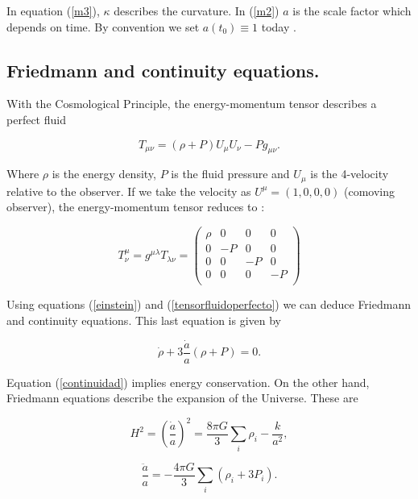 \documentclass[onecolumn,           %
               showpacs,            %
               preprintnumbers,     %
               aps,                 %
               letterpaper,             %
               superscriptaddress,      %
               nofootinbib,         %
               tightenlines,        %
               floats,floatfix      %
               ,usenatbib,
               ]{revtex4-1}
\begin{document}
In equation (\ref{m3}), $\kappa$ describes the curvature. In (\ref{m2}) $a$ is the scale factor which depends on time. By convention we set $a(t_0) \equiv 1$ today \cite{cambridge}.

\subsection{Friedmann and continuity equations.}
With the Cosmological Principle, the energy-momentum tensor describes a perfect fluid \cite{cambridge}

\begin{equation}
\label{tensorfluidoperfecto}
T_{\mu \nu} = (\rho + P)U_{\mu}U_{\nu} - Pg_{\mu \nu} .
\end{equation} 

Where $\rho$ is the energy density, $P$ is the fluid pressure and $U_{\mu}$ is the 4-velocity relative to the observer. If we take the velocity as $U^{\mu} = \left(1,0,0,0\right)$ (comoving observer), the energy-momentum tensor reduces to \cite{cambridge}:

\begin{equation}
T^{\mu}_{\nu} = g^{\mu \lambda} T_{\lambda \nu} = \begin{pmatrix}
\rho & 0 & 0 & 0 \\
0 & -P & 0 & 0 \\
0 & 0 & -P & 0 \\
0 & 0 & 0 & -P \\
\end{pmatrix} 
\end{equation}

Using equations (\ref{einstein}) and (\ref{tensorfluidoperfecto}) we can deduce Friedmann and continuity equations. This last equation is given by

\begin{equation}
\label{continuidad}
\dot{\rho} + 3 \frac{\dot{a}}{a} \left(\rho + P\right) = 0.
\end{equation}

Equation (\ref{continuidad}) implies energy conservation. On the other hand, Friedmann equations describe the expansion of the Universe. These are

\begin{equation}
\label{friedmann1}
H^2 = \left(\frac{\dot{a}}{a}\right)^2 = \frac{8 \pi G}{3} \sum_{i}\rho_{i} - \frac{k}{a^2} ,
\end{equation}

\begin{equation}
\frac{\ddot{a}}{a} = -\frac{4 \pi G}{3} \sum_{i}\left(\rho_i + 3P_i\right) .
\end{equation}
\end{document}
